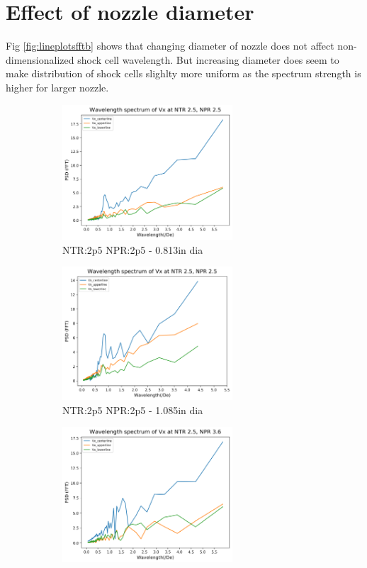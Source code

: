 \section{Effect of nozzle diameter}

Fig \ref{fig:lineplotsfftb} shows that changing diameter of nozzle does not affect non-dimensionalized shock cell wavelength. But increasing diameter does seem to make distribution of shock cells slighlty more uniform as the spectrum strength is higher for larger nozzle.

\begin{figure}[H]
\begin{subfigure}{.5\textwidth}
	\centering
	\includegraphics[width=2.5in]{images/Fft_Vx_NTR2p5_NPR2p5.png}
	\caption{NTR:2p5 NPR:2p5 - 0.813in dia }
	\label{fig:lineplotsfftb2p52p5}
\end{subfigure}%
\begin{subfigure}{.5\textwidth}
	\centering
	\includegraphics[width=2.5in]{images/Fft_Vx_NTR2p5_NPR2p5b.png}
	\caption{NTR:2p5 NPR:2p5 - 1.085in dia }
	\label{fig:lineplotsfft2p52p5b}
\end{subfigure}
\begin{subfigure}{.5\textwidth}
	\centering
	\includegraphics[width=2.5in]{images/Fft_Vx_NTR2p5_NPR3p6.png}

\end{subfigure}
\end{figure}
